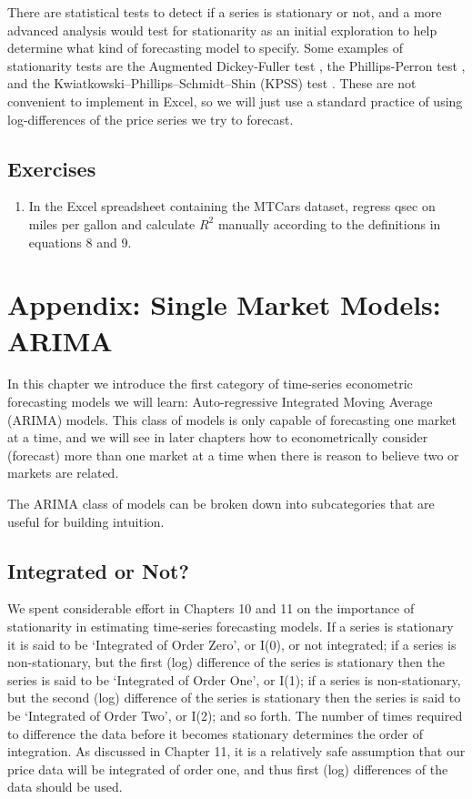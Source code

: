 \documentclass[]{book}
\providecommand{\tightlist}{%
  \setlength{\itemsep}{0pt}\setlength{\parskip}{0pt}}
\theoremstyle{definition}
\theoremstyle{definition}
\theoremstyle{remark}
\begin{document}
There are statistical tests to detect if a series is stationary or not,
and a more advanced analysis would test for stationarity as an initial
exploration to help determine what kind of forecasting model to specify.
Some examples of stationarity tests are the Augmented Dickey-Fuller test
\citep{dickey1979distribution}, the Phillips-Perron test
\citep{phillips1988testing}, and the
Kwiatkowski--Phillips--Schmidt--Shin (KPSS) test
\citep{kwiatkowski1992testing}. These are not convenient to implement in
Excel, so we will just use a standard practice of using log-differences
of the price series we try to forecast.

\section{Exercises}\label{exercises-7}

\begin{enumerate}
\def\labelenumi{\arabic{enumi}.}
\tightlist
\item
  In the Excel spreadsheet containing the MTCars dataset, regress qsec
  on miles per gallon and calculate \(R^2\) manually according to the
  definitions in equations 8 and 9.
\end{enumerate}

\chapter{Appendix: Single Market Models:
ARIMA}\label{appendix-single-market-models-arima}

In this chapter we introduce the first category of time-series
econometric forecasting models we will learn: Auto-regressive Integrated
Moving Average (ARIMA) models. This class of models is only capable of
forecasting one market at a time, and we will see in later chapters how
to econometrically consider (forecast) more than one market at a time
when there is reason to believe two or markets are related.

The ARIMA class of models can be broken down into subcategories that are
useful for building intuition.

\section{Integrated or Not?}\label{integrated-or-not}

We spent considerable effort in Chapters 10 and 11 on the importance of
stationarity in estimating time-series forecasting models. If a series
is stationary it is said to be `Integrated of Order Zero', or I(0), or
not integrated; if a series is non-stationary, but the first (log)
difference of the series is stationary then the series is said to be
`Integrated of Order One', or I(1); if a series is non-stationary, but
the second (log) difference of the series is stationary then the series
is said to be `Integrated of Order Two', or I(2); and so forth. The
number of times required to difference the data before it becomes
stationary determines the order of integration. As discussed in Chapter
11, it is a relatively safe assumption that our price data will be
integrated of order one, and thus first (log) differences of the data
should be used.
\end{document}
